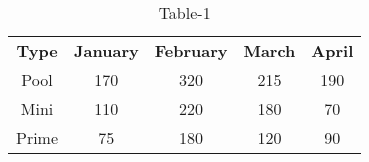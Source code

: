 \begin{table}[htbp]
\centering
  \caption{Table-1}
  \label{table1}
  \begin{tabular}{c|cccc}
\textbf{Type} & \textbf{January} & \textbf{February} & \textbf{March} & \textbf{April} \\
Pool & 170 & 320 & 215 & 190 \\
Mini & 110 & 220 & 180 & 70 \\
Prime & 75 & 180 & 120 & 90 \\
  \end{tabular}
\end{table}
